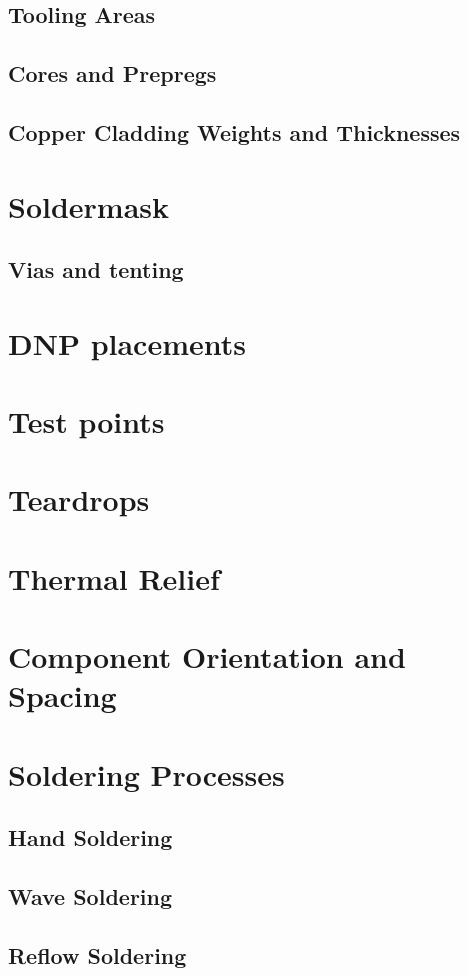 \subsection{Tooling Areas}
\subsection{Cores and Prepregs}
\subsection{Copper Cladding Weights and Thicknesses}

\section{Soldermask}
\subsection{Vias and tenting}

\section{DNP placements}
\section{Test points}
\section{Teardrops}
\section{Thermal Relief}
\section{Component Orientation and Spacing}
\section{Soldering Processes}
\subsection{Hand Soldering}
\subsection{Wave Soldering}
\subsection{Reflow Soldering}